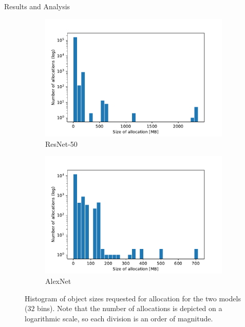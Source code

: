 \documentclass[10pt]{beamer}
\begin{document}

\begin{frame}[fragile]{Results and Analysis}


\begin{figure}[!ht]
  \centering
  \begin{subfigure}[b]{0.49\textwidth}
    \includegraphics[width=\textwidth]{../Quantitative_Python/ResNet-50_hist_MB_ylog.pdf}
    \caption{ResNet-50}
  \end{subfigure}
  \begin{subfigure}[b]{0.49\textwidth}
    \includegraphics[width=\textwidth]{../Quantitative_Python/AlexNet_hist_MB_ylog.pdf}
    \caption{AlexNet}
  \end{subfigure}
  \caption{Histogram of object sizes requested for allocation for the two models ($32$ bins). Note that the number of allocations is depicted on a logarithmic scale, so each division is an order of magnitude.}
  \label{fig:hist}
\end{figure}

\end{frame}
\end{document}
